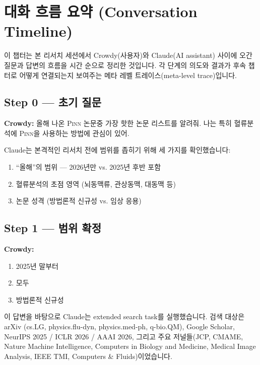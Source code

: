 \documentclass[11pt,a4paper,oneside]{report}
\newcommand{\pinn}{\textsc{Pinn}}
\begin{document}
\tableofcontents
\clearpage

\chapter{대화 흐름 요약 (Conversation Timeline)}

이 챕터는 본 리서치 세션에서 Crowdy(사용자)와 Claude(AI assistant) 사이에 오간 질문과 답변의 흐름을 시간 순으로 정리한 것입니다. 각 단계의 의도와 결과가 후속 챕터로 어떻게 연결되는지 보여주는 메타 레벨 트레이스(meta-level trace)입니다.

\section{Step 0 --- 초기 질문}

\begin{quotebox}
\textbf{Crowdy:} 올해 나온 \pinn{} 논문중 가장 핫한 논문 리스트를 알려줘. 나는 특히 혈류분석에 \pinn{}을 사용하는 방법에 관심이 있어.
\end{quotebox}

Claude는 본격적인 리서치 전에 범위를 좁히기 위해 세 가지를 확인했습니다:
\begin{enumerate}
\item ``올해''의 범위 --- 2026년만 vs. 2025년 후반 포함
\item 혈류분석의 초점 영역 (뇌동맥류, 관상동맥, 대동맥 등)
\item 논문 성격 (방법론적 신규성 vs. 임상 응용)
\end{enumerate}

\section{Step 1 --- 범위 확정}

\begin{quotebox}
\textbf{Crowdy:}
\begin{enumerate}
\item 2025년 말부터
\item 모두
\item 방법론적 신규성
\end{enumerate}
\end{quotebox}

이 답변을 바탕으로 Claude는 extended search task를 실행했습니다. 검색 대상은 arXiv (cs.LG, physics.flu-dyn, physics.med-ph, q-bio.QM), Google Scholar, NeurIPS 2025 / ICLR 2026 / AAAI 2026, 그리고 주요 저널들(JCP, CMAME, Nature Machine Intelligence, Computers in Biology and Medicine, Medical Image Analysis, IEEE TMI, Computers \& Fluids)이었습니다.
\end{document}
